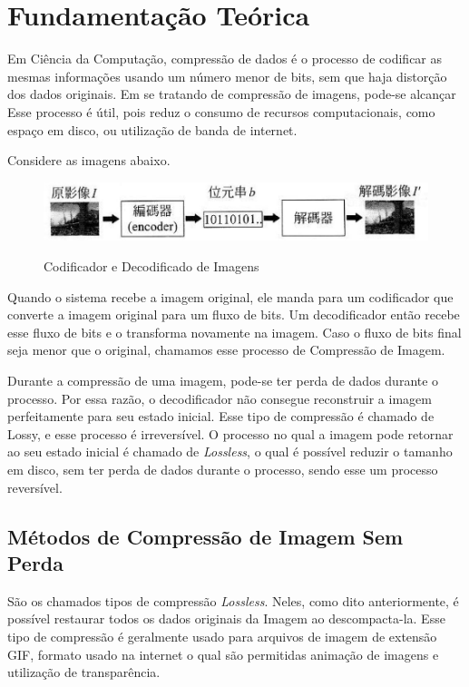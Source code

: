 \chapter{Fundamentação Teórica}
\label{c.fundamentacaoteorica}

Em Ciência da Computação, compressão de dados é o processo de codificar as mesmas informações usando um número menor de bits, sem que haja distorção dos dados originais. Em se tratando de compressão de imagens, pode-se alcançar Esse processo é útil, pois reduz o consumo de recursos computacionais, como espaço em disco, ou utilização de banda de internet.

Considere as imagens abaixo.

\begin{figure}[h]
\caption{\small Codificador e Decodificado de Imagens}
\centering
\includegraphics[scale=0.50]{figs/image_compression.jpg}
\label{f.imagecompressionbasics}
\end{figure}

Quando o sistema recebe a imagem original, ele manda para um codificador que converte a imagem original para um fluxo de bits. Um decodificador então recebe esse fluxo de bits e o transforma novamente na imagem. Caso o fluxo de bits final seja menor que o original, chamamos esse processo de Compressão de Imagem.

Durante a compressão de uma imagem, pode-se ter perda de dados durante o processo. Por essa razão, o decodificador não consegue reconstruir a imagem perfeitamente para seu estado inicial. Esse tipo de compressão é chamado de Lossy, e esse processo é irreversível. O processo no qual a imagem pode retornar ao seu estado inicial é chamado de {\em Lossless}, o qual é possível reduzir o tamanho em disco, sem ter perda de dados durante o processo, sendo esse um processo reversível.

\section{Métodos de Compressão de Imagem Sem Perda}
\label{s.lossless}

São os chamados tipos de compressão {\em Lossless}. Neles, como dito anteriormente, é possível restaurar todos os dados originais da Imagem ao descompacta-la. Esse tipo de compressão é geralmente usado para arquivos de imagem de extensão GIF, formato usado na internet o qual são permitidas animação de imagens e utilização de transparência.

